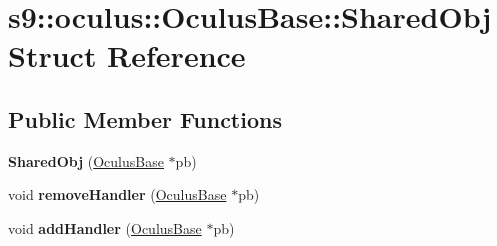 \hypertarget{structs9_1_1oculus_1_1OculusBase_1_1SharedObj}{\section{s9\-:\-:oculus\-:\-:Oculus\-Base\-:\-:Shared\-Obj Struct Reference}
\label{structs9_1_1oculus_1_1OculusBase_1_1SharedObj}
}
\subsection*{Public Member Functions}
\begin{DoxyCompactItemize}
\item 
\hypertarget{structs9_1_1oculus_1_1OculusBase_1_1SharedObj_a418315a53d540e4d108e287c7aeee968}{{\bfseries Shared\-Obj} (\hyperlink{classs9_1_1oculus_1_1OculusBase}{Oculus\-Base} $\ast$pb)}\label{structs9_1_1oculus_1_1OculusBase_1_1SharedObj_a418315a53d540e4d108e287c7aeee968}

\item 
\hypertarget{structs9_1_1oculus_1_1OculusBase_1_1SharedObj_a78657ecab21e06631fa1ede8ae62d153}{void {\bfseries remove\-Handler} (\hyperlink{classs9_1_1oculus_1_1OculusBase}{Oculus\-Base} $\ast$pb)}\label{structs9_1_1oculus_1_1OculusBase_1_1SharedObj_a78657ecab21e06631fa1ede8ae62d153}

\item 
\hypertarget{structs9_1_1oculus_1_1OculusBase_1_1SharedObj_a2703b4fef1313e479483857f0b5e0a00}{void {\bfseries add\-Handler} (\hyperlink{classs9_1_1oculus_1_1OculusBase}{Oculus\-Base} $\ast$pb)}\label{structs9_1_1oculus_1_1OculusBase_1_1SharedObj_a2703b4fef1313e479483857f0b5e0a00}

\end{DoxyCompactItemize}
